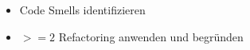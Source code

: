 \begin{itemize}
	\item Code Smells identifizieren
	\item $>= 2$ Refactoring anwenden und begründen

\end{itemize}